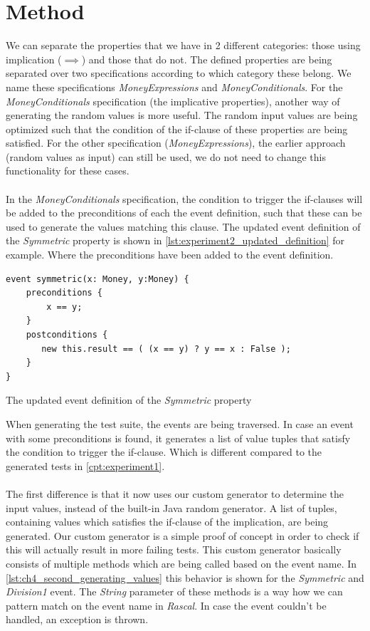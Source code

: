 \section{Method}
We can separate the properties that we have in 2 different categories: those using implication ($\implies$) and those that do not. The defined properties are being separated over two specifications according to which category these belong. We name these specifications \textit{MoneyExpressions} and \textit{MoneyConditionals}. For the \textit{MoneyConditionals} specification (the implicative properties), another way of generating the random values is more useful. The random input values are being optimized such that the condition of the if-clause of these properties are being satisfied. For the other specification (\textit{MoneyExpressions}), the earlier approach (random values as input) can still be used, we do not need to change this functionality for these cases.\\
\\
In the \textit{MoneyConditionals} specification, the condition to trigger the if-clauses will be added to the preconditions of each the event definition, such that these can be used to generate the values matching this clause. The updated event definition of the \textit{Symmetric} property is shown in \autoref{lst:experiment2_updated_definition} for example. Where the preconditions have been added to the event definition.
\FloatBarrier
\begin{sourcecode}[!ht]
\begin{lstlisting}[language=Rebel]
event symmetric(x: Money, y:Money) {
    preconditions {
        x == y;
    }
    postconditions {
       new this.result == ( (x == y) ? y == x : False );
    }
}
\end{lstlisting}
\caption{The updated event definition of the \textit{Symmetric} property}
\label{lst:experiment2_updated_definition}
\end{sourcecode}
\FloatBarrier
When generating the test suite, the events are being traversed. In case an event with some preconditions is found, it generates a list of value tuples that satisfy the condition to trigger the if-clause. Which is different compared to the generated tests in \autoref{cpt:experiment1}.\\
\\
The first difference is that it now uses our custom generator to determine the input values, instead of the built-in Java random generator. A list of tuples, containing values which satisfies the if-clause of the implication, are being generated. Our custom generator is a simple proof of concept in order to check if this will actually result in more failing tests. This custom generator basically consists of multiple methods which are being called based on the event name. In \autoref{lst:ch4_second_generating_values} this behavior is shown for the \textit{Symmetric} and \textit{Division1} event. The \textit{String} parameter of these methods is a way how we can pattern match on the event name in \textit{Rascal}. In case the event couldn't be handled, an exception is thrown.
